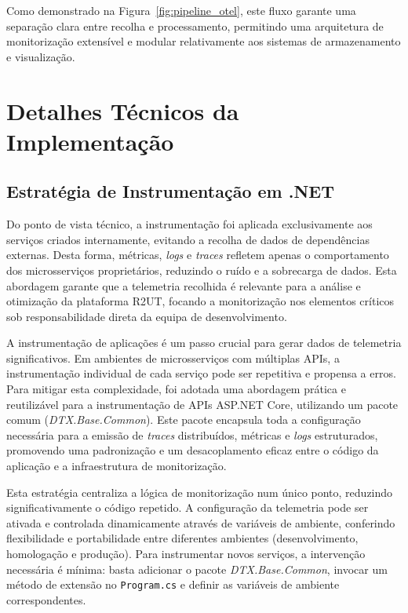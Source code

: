 Como demonstrado na Figura~\ref{fig:pipeline_otel}, este fluxo garante uma separação clara entre recolha e processamento, permitindo uma arquitetura de monitorização extensível e modular relativamente aos sistemas de armazenamento e visualização.


\section{Detalhes Técnicos da Implementação}

\subsection{Estratégia de Instrumentação em .NET}

Do ponto de vista técnico, a instrumentação foi aplicada exclusivamente aos serviços criados internamente, evitando a recolha de dados de dependências externas. Desta forma, métricas, \textit{logs} e \textit{traces} refletem apenas o comportamento dos microsserviços proprietários, reduzindo o ruído e a sobrecarga de dados. Esta abordagem garante que a telemetria recolhida é relevante para a análise e otimização da plataforma R2UT, focando a monitorização nos elementos críticos sob responsabilidade direta da equipa de desenvolvimento.

A instrumentação de aplicações é um passo crucial para gerar dados de telemetria significativos. Em ambientes de microsserviços com múltiplas APIs, a instrumentação individual de cada serviço pode ser repetitiva e propensa a erros. Para mitigar esta complexidade, foi adotada uma abordagem prática e reutilizável para a instrumentação de APIs ASP.NET Core, utilizando um pacote comum (\textit{DTX.Base.Common}). Este pacote encapsula toda a configuração necessária para a emissão de \textit{traces} distribuídos, métricas e \textit{logs} estruturados, promovendo uma padronização e um desacoplamento eficaz entre o código da aplicação e a infraestrutura de monitorização.

Esta estratégia centraliza a lógica de monitorização num único ponto, reduzindo significativamente o código repetido. A configuração da telemetria pode ser ativada e controlada dinamicamente através de variáveis de ambiente, conferindo flexibilidade e portabilidade entre diferentes ambientes (desenvolvimento, homologação e produção). Para instrumentar novos serviços, a intervenção necessária é mínima: basta adicionar o pacote \textit{DTX.Base.Common}, invocar um método de extensão no \texttt{Program.cs} e definir as variáveis de ambiente correspondentes.

